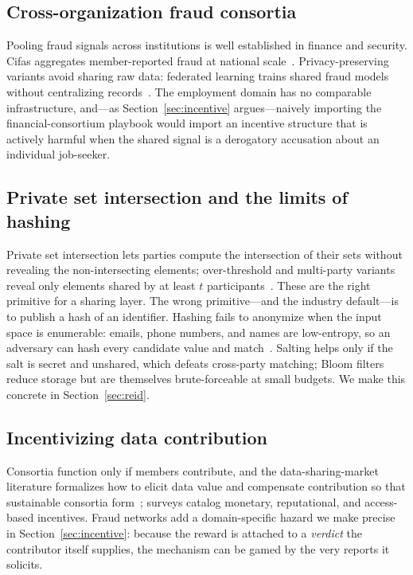 \documentclass[11pt]{article}
\begin{document}
\subsection{Cross-organization fraud consortia}
Pooling fraud signals across institutions is well established in finance and
security. Cifas aggregates member-reported fraud at national
scale~\cite{cifas}. Privacy-preserving variants avoid sharing raw data: federated
learning trains shared fraud models without centralizing
records~\cite{starlit2024}. The employment domain has no comparable
infrastructure, and---as Section~\ref{sec:incentive} argues---naively importing
the financial-consortium playbook would import an incentive structure that is
actively harmful when the shared signal is a derogatory accusation about an
individual job-seeker.

\subsection{Private set intersection and the limits of hashing}
Private set intersection lets parties compute the intersection of their sets
without revealing the non-intersecting elements; over-threshold and multi-party
variants reveal only elements shared by at least $t$ participants~\cite{otpsi2026}.
These are the right primitive for a sharing layer. The wrong primitive---and the
industry default---is to publish a hash of an identifier. Hashing fails to
anonymize when the input space is enumerable: emails, phone numbers, and names
are low-entropy, so an adversary can hash every candidate value and
match~\cite{cook2019,skyflow}. Salting helps only if the salt is secret and
unshared, which defeats cross-party matching; Bloom filters~\cite{bloom1970}
reduce storage but are themselves brute-forceable at small budgets. We make this
concrete in Section~\ref{sec:reid}.

\subsection{Incentivizing data contribution}
Consortia function only if members contribute, and the data-sharing-market
literature formalizes how to elicit data value and compensate contribution so
that sustainable consortia form~\cite{datasharing2023}; surveys catalog monetary,
reputational, and access-based incentives. Fraud networks add a domain-specific
hazard we make precise in Section~\ref{sec:incentive}: because the reward is
attached to a \emph{verdict} the contributor itself supplies, the mechanism can
be gamed by the very reports it solicits.
\end{document}
